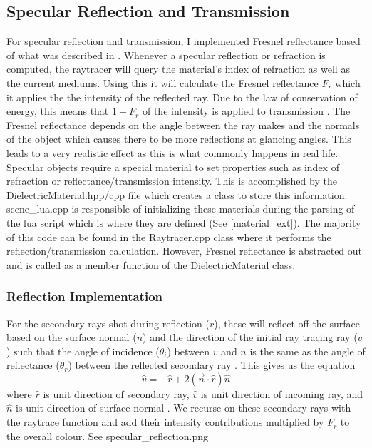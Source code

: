 \documentclass {article}
\begin{document}
\subsection{Specular Reflection and Transmission}
For specular reflection and transmission, I implemented Fresnel reflectance based of what 
was described in \cite{PBR}. Whenever a specular reflection or refraction is computed, the raytracer
will query the material's index of refraction as well as the current mediums. Using this
it will calculate the Fresnel reflectance $F_r$ which it applies the the intensity of the
reflected ray. Due to the law of conservation of energy, this means that $1-F_r$ of the intensity
is applied to transmission \cite{PBR}. The Fresnel reflectance depends on the angle between
the ray makes and the normals of the
object which causes there to be more reflections at glancing angles. This leads to a very realistic
effect as this is what commonly happens in real life. Specular objects require a special material
to set properties such as index of refraction or reflectance/transmission intensity. This is 
accomplished by the DielectricMaterial.hpp/cpp file which creates a class to store this information.
scene\_lua.cpp is responsible of initializing these materials during the parsing of the lua script which
is where they are defined (See \ref{material_ext}). The majority of this code can be found in
the Raytracer.cpp class where it performs the reflection/transmission calculation. However, Fresnel reflectance
is abstracted out and is called as a member function of the DielectricMaterial class.
\subsubsection{Reflection Implementation}
For the secondary rays shot during reflection ($r$), these  will
reflect off the surface based on the surface normal ($n$) and the direction of
the initial ray tracing ray ($v$) such that the angle of incidence ($\theta_i$)
between $v$ and $n$ is the same as the angle of reflectance ($\theta_r$) between
the reflected secondary ray \cite{PBR}. This gives us the equation
$$\hat{v}=-\hat{r}+2(\vec{n}\cdot\hat{r})\hat{n}$$
where $\hat{r}$ is unit direction of secondary ray, $\hat{v}$ is unit
direction of incoming ray, and $\hat{n}$ is unit direction of surface normal \cite{PBR}.
We recurse on these secondary rays with the raytrace function and add their intensity contributions multiplied
by $F_r$ to the overall colour. See specular\_reflection.png
\end{document}
